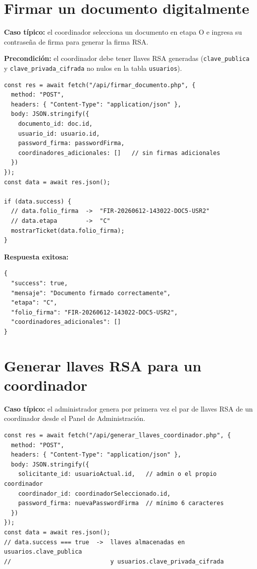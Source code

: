 \documentclass[10pt,letterpaper]{report}
\begin{document}
\section{Firmar un documento digitalmente}

\textbf{Caso típico:} el coordinador selecciona un documento en etapa O e ingresa su contraseña de firma para generar la firma RSA.

\textbf{Precondición:} el coordinador debe tener llaves RSA generadas (\texttt{clave\_publica} y \texttt{clave\_privada\_cifrada} no nulos en la tabla \texttt{usuarios}).

\begin{lstlisting}[style=jsstyle, caption={Firma digital de documento desde GestorDocumentos.jsx (elaboración propia).}]
const res = await fetch("/api/firmar_documento.php", {
  method: "POST",
  headers: { "Content-Type": "application/json" },
  body: JSON.stringify({
    documento_id: doc.id,
    usuario_id: usuario.id,
    password_firma: passwordFirma,
    coordinadores_adicionales: []   // sin firmas adicionales
  })
});
const data = await res.json();

if (data.success) {
  // data.folio_firma  ->  "FIR-20260612-143022-DOC5-USR2"
  // data.etapa        ->  "C"
  mostrarTicket(data.folio_firma);
}
\end{lstlisting}

\textbf{Respuesta exitosa:}

\begin{lstlisting}[style=bashstyle, caption={Respuesta de firmar\_documento.php tras firma RSA exitosa (elaboración propia).}]
{
  "success": true,
  "mensaje": "Documento firmado correctamente",
  "etapa": "C",
  "folio_firma": "FIR-20260612-143022-DOC5-USR2",
  "coordinadores_adicionales": []
}
\end{lstlisting}

\section{Generar llaves RSA para un coordinador}

\textbf{Caso típico:} el administrador genera por primera vez el par de llaves RSA de un coordinador desde el Panel de Administración.

\begin{lstlisting}[style=jsstyle, caption={Generación de llaves RSA-2048 para un coordinador (elaboración propia).}]
const res = await fetch("/api/generar_llaves_coordinador.php", {
  method: "POST",
  headers: { "Content-Type": "application/json" },
  body: JSON.stringify({
    solicitante_id: usuarioActual.id,   // admin o el propio coordinador
    coordinador_id: coordinadorSeleccionado.id,
    password_firma: nuevaPasswordFirma  // mínimo 6 caracteres
  })
});
const data = await res.json();
// data.success === true  ->  llaves almacenadas en usuarios.clave_publica
//                            y usuarios.clave_privada_cifrada
\end{lstlisting}
\end{document}
